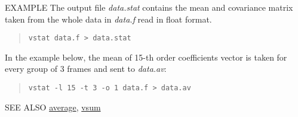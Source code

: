 \begin{qsection}{EXAMPLE}
The output file {\em data.stat} contains the mean and covariance matrix
taken from the whole data in {\em data.f} read in float format.
\begin{quote}
  \verb!vstat data.f > data.stat!
\end{quote}

In the example below, the mean of 15-th order coefficients vector is taken
for every group of 3 frames and sent to {\em data.av}:
\begin{quote}
  \verb!vstat -l 15 -t 3 -o 1 data.f > data.av!
\end{quote}
\end{qsection}

\begin{qsection}{SEE ALSO}
\hyperlink{average}{average},
\hyperlink{vsum}{vsum}
\end{qsection}
